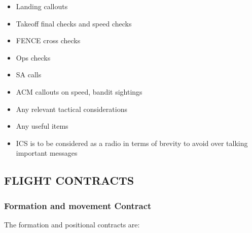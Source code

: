 \begin{itemize}

  \item Landing callouts

  \item Takeoff final checks and speed checks

  \item FENCE cross checks

  \item Ops checks

  \item SA calls

  \item ACM callouts on speed, bandit sightings

  \item Any relevant tactical considerations

  \item Any useful items

  \item ICS is to be considered as a radio in terms of brevity to avoid over
    talking important messages

\end{itemize}

\subsection{FLIGHT CONTRACTS}

\subsubsection{Formation and movement Contract}

The formation and positional contracts are:

